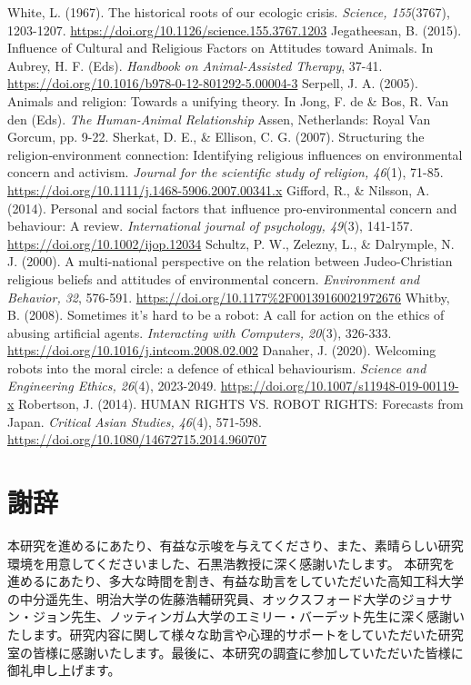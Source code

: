 \documentclass[a4j,12pt]{jreport}
\begin{document}
\begin{thebibliography}{999}
 White, L. (1967). The historical roots of our ecologic crisis. \textsl{Science, 155}(3767), 1203-1207. \url{https://doi.org/10.1126/science.155.3767.1203}
 Jegatheesan, B. (2015). Influence of Cultural and Religious Factors on Attitudes toward Animals. In Aubrey, H. F. (Eds). \textsl{Handbook on Animal-Assisted Therapy}, 37-41. \url{https://doi.org/10.1016/b978-0-12-801292-5.00004-3}
 Serpell, J. A. (2005). Animals and religion: Towards a unifying theory. In Jong, F. de \& Bos, R. Van den (Eds). \textsl{The Human-Animal Relationship} Assen, Netherlands: Royal Van Gorcum, pp. 9-22.
 Sherkat, D. E., \& Ellison, C. G. (2007). Structuring the religion‐environment connection: Identifying religious influences on environmental concern and activism. \textsl{Journal for the scientific study of religion, 46}(1), 71-85. \url{https://doi.org/10.1111/j.1468-5906.2007.00341.x}
 Gifford, R., \& Nilsson, A. (2014). Personal and social factors that influence pro‐environmental concern and behaviour: A review. \textsl{International journal of psychology, 49}(3), 141-157. \url{https://doi.org/10.1002/ijop.12034}
 Schultz, P. W., Zelezny, L., \& Dalrymple, N. J. (2000). A multi-national perspective on the relation between Judeo-Christian religious beliefs and attitudes of environmental concern. \textsl{Environment and Behavior, 32}, 576-591. \url{https://doi.org/10.1177\%2F00139160021972676}
 Whitby, B. (2008). Sometimes it’s hard to be a robot: A call for action on the ethics of abusing artificial agents. \textsl{Interacting with Computers, 20}(3), 326-333. \url{https://doi.org/10.1016/j.intcom.2008.02.002}
 Danaher, J. (2020). Welcoming robots into the moral circle: a defence of ethical behaviourism. \textsl{Science and Engineering Ethics, 26}(4), 2023-2049. \url{https://doi.org/10.1007/s11948-019-00119-x}
 Robertson, J. (2014). HUMAN RIGHTS VS. ROBOT RIGHTS: Forecasts from Japan. \textsl{Critical Asian Studies, 46}(4), 571-598. \url{https://doi.org/10.1080/14672715.2014.960707}

\end{thebibliography}









\newpage
\chapter*{謝辞}
本研究を進めるにあたり、有益な示唆を与えてくださり、また、素晴らしい研究環境を用意してくださいました、石黒浩教授に深く感謝いたします。
本研究を進めるにあたり、多大な時間を割き、有益な助言をしていただいた高知工科大学の中分遥先生、明治大学の佐藤浩輔研究員、オックスフォード大学のジョナサン・ジョン先生、ノッティンガム大学のエミリー・バーデット先生に深く感謝いたします。研究内容に関して様々な助言や心理的サポートをしていただいた研究室の皆様に感謝いたします。最後に、本研究の調査に参加していただいた皆様に御礼申し上げます。
\end{document}
